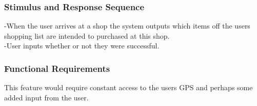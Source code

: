 \documentclass[12pt]{article}
\begin{document}
 \subsubsection{Stimulus and Response Sequence}
-When the user arrives at a shop the system outputs which items off  the users shopping list are intended to purchased at this shop.\\
-User  inputs whether or not they were successful.
 \subsubsection{Functional Requirements}
 This feature would require constant access to the users GPS and perhaps some added input from the user. 
 
 
\end{document}
